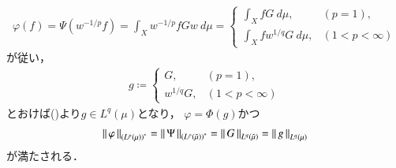 \begin{prf}
\begin{description}
				\begin{align}
					\varphi(f) = \Psi\left( w^{-1/p} f \right)
					= \int_X w^{-1/p} f G w\ d\mu
					= \begin{cases}
						\displaystyle\int_X f G\ d\mu, & (p = 1), \\
						\displaystyle\int_X f w^{1/q} G\ d\mu, & (1 < p < \infty)
					\end{cases}
				\end{align}
				が従い，
				\begin{align}
					g \coloneqq
					\begin{cases}
						G, & (p = 1), \\
						w^{1/q} G, & (1 < p < \infty)
					\end{cases}
				\end{align}
				とおけば()より$g \in L^q(\mu)$となり，
				$\varphi = \Phi(g)$かつ
				\begin{align}
					\left\|\, \varphi\, \right\|_{\left( L^p(\mu) \right)^*} = \left\|\, \Psi\, \right\|_{\left( L^p(\tilde{\mu}) \right)^*}
					= \left\|\, G\, \right\|_{L^q(\tilde{\mu})}
					= \left\|\, g\, \right\|_{L^q(\mu)}
				\end{align}
				が満たされる．
				\QED
		\end{description}
	\end{prf}